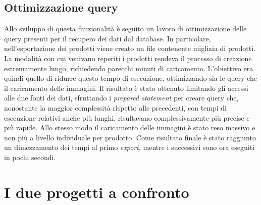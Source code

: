 \subsection{Ottimizzazione query}
Allo sviluppo di questa funzionalità è seguito un lavoro di ottimizzazione delle query presenti per il recupero dei dati dal database. In particolare, nell'esportazione dei prodotti viene creato un file contenente migliaia di prodotti. La modalità con cui venivano reperiti i prodotti rendeva il processo di creazione estremamente lungo, richiedendo parecchi minuti di caricamento. L'obiettivo era quindi quello di ridurre questo tempo di esecuzione, ottimizzando sia le query che il caricamento delle immagini. Il risultato è stato ottenuto limitando gli accessi alle due fonti dei dati, sfruttando i \textit{prepared statement} per creare query che, nonostante la maggior complessità rispetto alle precedenti, con tempi di esecuzione relativi anche più lunghi, risultavano complessivamente più precise e più rapide. Allo stesso modo il caricamento delle immagini è stato reso massivo e non più a livello individuale per prodotto. Come risultato finale è stato raggiunto un dimezzamento dei tempi al primo \textit{export}, mentre i successivi sono ora eseguiti in pochi secondi.

\section{I due progetti a confronto}
